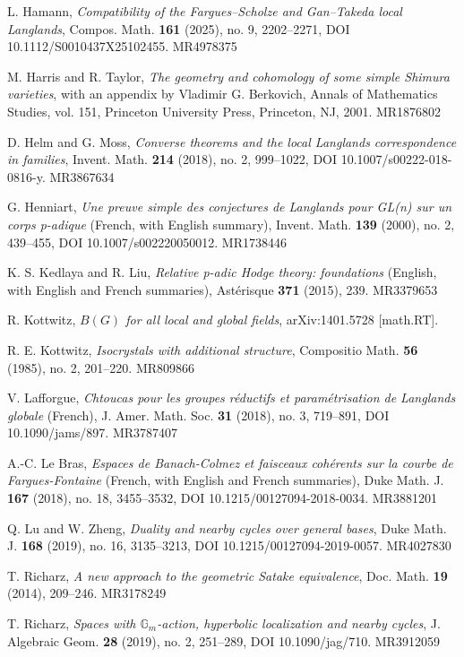 \begin{refs}
\item[{[10]}] L. Hamann, \emph{Compatibility of the Fargues--Scholze and Gan--Takeda local Langlands}, Compos. Math. \textbf{161} (2025), no. 9, 2202--2271, DOI 10.1112/S0010437X25102455. MR4978375
\item[{[11]}] M. Harris and R. Taylor, \emph{The geometry and cohomology of some simple Shimura varieties}, with an appendix by Vladimir G. Berkovich, Annals of Mathematics Studies, vol. 151, Princeton University Press, Princeton, NJ, 2001. MR1876802
\item[{[12]}] D. Helm and G. Moss, \emph{Converse theorems and the local Langlands correspondence in families}, Invent. Math. \textbf{214} (2018), no. 2, 999--1022, DOI 10.1007/s00222-018-0816-y. MR3867634
\item[{[13]}] G. Henniart, \emph{Une preuve simple des conjectures de Langlands pour GL(n) sur un corps p-adique} (French, with English summary), Invent. Math. \textbf{139} (2000), no. 2, 439--455, DOI 10.1007/s002220050012. MR1738446
\item[{[14]}] K. S. Kedlaya and R. Liu, \emph{Relative p-adic Hodge theory: foundations} (English, with English and French summaries), Ast\'erisque \textbf{371} (2015), 239. MR3379653
\item[{[15]}] R. Kottwitz, \emph{$B(G)$ for all local and global fields}, arXiv:1401.5728 [math.RT].
\item[{[16]}] R. E. Kottwitz, \emph{Isocrystals with additional structure}, Compositio Math. \textbf{56} (1985), no. 2, 201--220. MR809866
\item[{[17]}] V. Lafforgue, \emph{Chtoucas pour les groupes r\'eductifs et param\'etrisation de Langlands globale} (French), J. Amer. Math. Soc. \textbf{31} (2018), no. 3, 719--891, DOI 10.1090/jams/897. MR3787407
\item[{[18]}] A.-C. Le Bras, \emph{Espaces de Banach-Colmez et faisceaux coh\'erents sur la courbe de Fargues-Fontaine} (French, with English and French summaries), Duke Math. J. \textbf{167} (2018), no. 18, 3455--3532, DOI 10.1215/00127094-2018-0034. MR3881201
\item[{[19]}] Q. Lu and W. Zheng, \emph{Duality and nearby cycles over general bases}, Duke Math. J. \textbf{168} (2019), no. 16, 3135--3213, DOI 10.1215/00127094-2019-0057. MR4027830
\item[{[20]}] T. Richarz, \emph{A new approach to the geometric Satake equivalence}, Doc. Math. \textbf{19} (2014), 209--246. MR3178249
\item[{[21]}] T. Richarz, \emph{Spaces with $\mathbb{G}_m$-action, hyperbolic localization and nearby cycles}, J. Algebraic Geom. \textbf{28} (2019), no. 2, 251--289, DOI 10.1090/jag/710. MR3912059

\end{refs}
